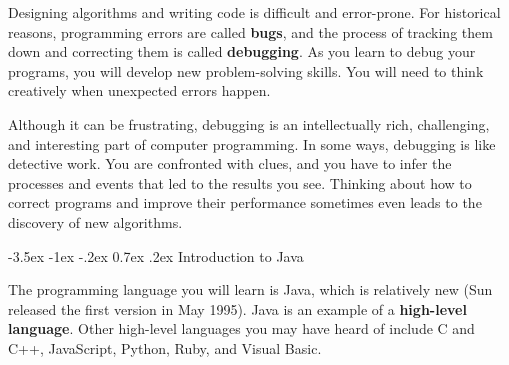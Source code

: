 \documentclass[12pt]{book}
\makeatletter
\theoremstyle{exercise}
\renewcommand{\section}{\@startsection {section}{1}{\z@}%
    {-3.5ex \@plus -1ex \@minus -.2ex}%
    {0.7ex \@plus.2ex}%
    {\normalfont\Large\bfseries}}
\makeatother
\begin{document}

Designing algorithms and writing code is difficult and error-prone.
For historical reasons, programming errors are called {\bf bugs}, and the process of tracking them down and correcting them is called {\bf debugging}.
As you learn to debug your programs, you will develop new problem-solving skills.
You will need to think creatively when unexpected errors happen.




Although it can be frustrating, debugging is an intellectually rich, challenging, and interesting part of computer programming.
In some ways, debugging is like detective work.
You are confronted with clues, and you have to infer the processes and events that led to the results you see.
Thinking about how to correct programs and improve their performance sometimes even leads to the discovery of new algorithms.


\section{Introduction to Java}


The programming language you will learn is Java, which is relatively new (Sun released the first version in May 1995).
Java is an example of a {\bf high-level language}.
Other high-level languages you may have heard of include C and C++, JavaScript, Python, Ruby, and Visual Basic.

\end{document}
